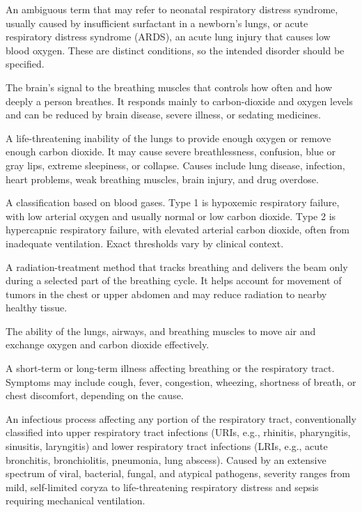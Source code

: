  An ambiguous term that may refer to neonatal respiratory distress syndrome, usually caused by insufficient surfactant in a newborn's lungs, or acute respiratory distress syndrome (ARDS), an acute lung injury that causes low blood oxygen. These are distinct conditions, so the intended disorder should be specified.

 The brain’s signal to the breathing muscles that controls how often and how deeply a person breathes. It responds mainly to carbon-dioxide and oxygen levels and can be reduced by brain disease, severe illness, or sedating medicines.

 A life-threatening inability of the lungs to provide enough oxygen or remove enough carbon dioxide. It may cause severe breathlessness, confusion, blue or gray lips, extreme sleepiness, or collapse. Causes include lung disease, infection, heart problems, weak breathing muscles, brain injury, and drug overdose.

 A classification based on blood gases. Type 1 is hypoxemic respiratory failure, with low arterial oxygen and usually normal or low carbon dioxide. Type 2 is hypercapnic respiratory failure, with elevated arterial carbon dioxide, often from inadequate ventilation. Exact thresholds vary by clinical context.

 A radiation-treatment method that tracks breathing and delivers the beam only during a selected part of the breathing cycle. It helps account for movement of tumors in the chest or upper abdomen and may reduce radiation to nearby healthy tissue.

 The ability of the lungs, airways, and breathing muscles to move air and exchange oxygen and carbon dioxide effectively.

 A short-term or long-term illness affecting breathing or the respiratory tract. Symptoms may include cough, fever, congestion, wheezing, shortness of breath, or chest discomfort, depending on the cause.

 An infectious process affecting any portion of the respiratory tract, conventionally classified into upper respiratory tract infections (URIs, e.g., rhinitis, pharyngitis, sinusitis, laryngitis) and lower respiratory tract infections (LRIs, e.g., acute bronchitis, bronchiolitis, pneumonia, lung abscess). Caused by an extensive spectrum of viral, bacterial, fungal, and atypical pathogens, severity ranges from mild, self-limited coryza to life-threatening respiratory distress and sepsis requiring mechanical ventilation.

